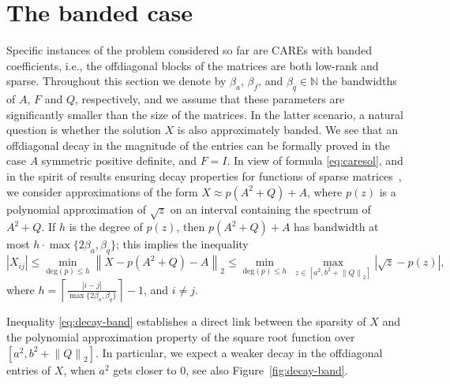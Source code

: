 \documentclass[a4paper,10pt]{article}
\newcommand{\norm}[1]{\left\lVert#1\right\rVert}
\begin{document}
\section{The banded case}\label{sec:banded}
Specific instances of the problem considered so far are CAREs with banded coefficients, i.e., the offdiagonal blocks of the matrices are both low-rank and sparse. Throughout this section we denote by $\beta_a$, $\beta_f$, and $\beta_q \in \mathbb{N}$ the bandwidths of  $A$, $F$ and $Q$, respectively, and we assume that these parameters are significantly smaller than the size of the matrices. In the latter scenario, a natural question is whether the solution $X$ is also approximately banded. We see that an offdiagonal decay in the magnitude of the entries can be formally proved in the case $A$ symmetric positive definite, and $F=I$. In view of formula \eqref{eq:caresol}, and in the spirit of results ensuring decay properties for functions of sparse matrices~\cite{benzi-boito}, we consider approximations of the form $X\approx p(A^2+Q)+A$, where $p(z)$ is a polynomial approximation of $\sqrt{z}$ on an interval containing the spectrum of $A^2+Q$. If $h$ is the degree of $p(z)$, then $p(A^2+Q)+A$ has bandwidth at most $h\cdot \max\{2\beta_a,\beta_q\}$; this implies the inequality
\begin{equation}\label{eq:decay-band}
|X_{ij}|\le \min_{\mathrm{deg}(p)\le h}\norm{X-p(A^2+Q)-A}_2\le \min_{\mathrm{deg}(p)\le h}\ \max_{z\in[a^2, b^2+\norm{Q}_2]}|\sqrt{z}-p(z)|,
\end{equation}
where $h=\left\lceil\frac{|i-j|}{\max\{2\beta_a,\beta_q\}} \right\rceil-1$, and $i\neq j$. 

Inequality \eqref{eq:decay-band} establishes a direct link between the sparsity of $X$ and the polynomial approximation property of the square root function over $[a^2, b^2+\norm{Q}_2]$. In particular, we expect a weaker decay in the offdiagonal entries of $X$, when $a^2$ gets closer to $0$, see also Figure~\ref{fig:decay-band}.
\end{document}
